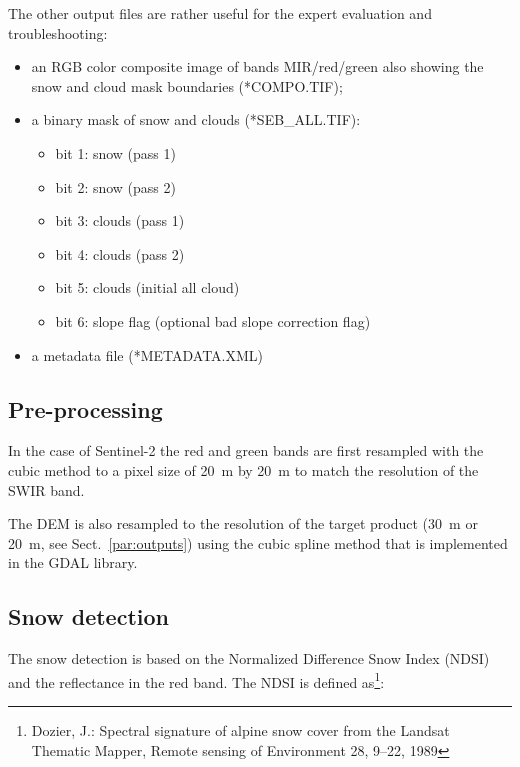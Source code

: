 \documentclass[a4paper]{article}
\begin{document}
The other output files are rather useful for the expert evaluation and troubleshooting:
\begin{itemize}
 \item an RGB color composite image of bands MIR/red/green also showing the snow and cloud mask boundaries (*COMPO.TIF);
 \item a binary mask of snow and clouds (*SEB\_ALL.TIF):
 \begin{itemize}
 \item bit 1: snow (pass 1)
 \item bit 2: snow (pass 2)
 \item bit 3: clouds (pass 1)
 \item bit 4: clouds (pass 2)
 \item bit 5: clouds (initial all cloud)
 \item bit 6: slope flag (optional bad slope correction flag)
 \end{itemize}
 \item a metadata file (*METADATA.XML)
 
\end{itemize}

\subsection{Pre-processing}

In the case of Sentinel-2 the red and green bands are first resampled with the cubic method to a pixel size of 20~m by 20~m to match the resolution of the SWIR band.

The DEM is also resampled to the resolution of the target product (30~m or 20~m, see Sect.~\ref{par:outputs}) using the cubic spline method that is implemented in the GDAL library.

\subsection{Snow detection}\label{par:snowdetec}

The snow detection is based on the Normalized Difference Snow Index (NDSI) and the reflectance in the red band. The NDSI is defined as\footnote{Dozier, J.: Spectral signature of alpine snow cover from the Landsat Thematic Mapper, Remote sensing of Environment 28, 9–22, 1989}:
\end{document}
